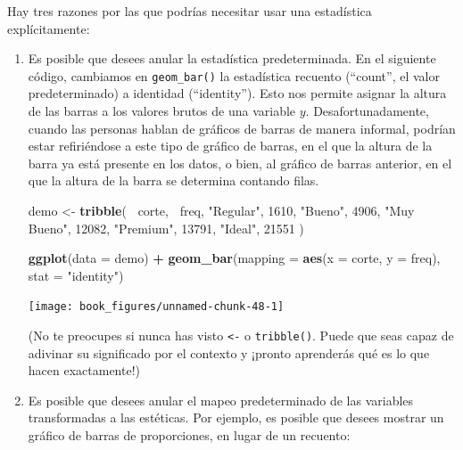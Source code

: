 \documentclass[11pt,oneside]{report}
\newenvironment{Shaded}{\begin{snugshade}}{\end{snugshade}}
\newcommand{\DataTypeTok}[1]{\textcolor[rgb]{0.13,0.29,0.53}{#1}}
\newcommand{\DecValTok}[1]{\textcolor[rgb]{0.00,0.00,0.81}{#1}}
\newcommand{\KeywordTok}[1]{\textcolor[rgb]{0.13,0.29,0.53}{\textbf{#1}}}
\newcommand{\NormalTok}[1]{#1}
\newcommand{\OperatorTok}[1]{\textcolor[rgb]{0.81,0.36,0.00}{\textbf{#1}}}
\newcommand{\StringTok}[1]{\textcolor[rgb]{0.31,0.60,0.02}{#1}}
\begin{document}
Hay tres razones por las que podrías necesitar usar una estadística
explícitamente:

\begin{enumerate}
\def\labelenumi{\arabic{enumi}.}
\item
  Es posible que desees anular la estadística predeterminada. En el
  siguiente código, cambiamos en \texttt{geom\_bar()} la estadística
  recuento (``count'', el valor predeterminado) a identidad
  (``identity''). Esto nos permite asignar la altura de las barras a los
  valores brutos de una variable \(y\). Desafortunadamente, cuando las
  personas hablan de gráficos de barras de manera informal, podrían
  estar refiriéndose a este tipo de gráfico de barras, en el que la
  altura de la barra ya está presente en los datos, o bien, al gráfico
  de barras anterior, en el que la altura de la barra se determina
  contando filas.

\begin{Shaded}
\begin{Highlighting}[]
\NormalTok{demo <-}\StringTok{ }\KeywordTok{tribble}\NormalTok{(}
  \OperatorTok{~}\NormalTok{corte,     }\OperatorTok{~}\NormalTok{freq,}
  \StringTok{"Regular"}\NormalTok{,   }\DecValTok{1610}\NormalTok{,}
  \StringTok{"Bueno"}\NormalTok{,     }\DecValTok{4906}\NormalTok{,}
  \StringTok{"Muy Bueno"}\NormalTok{, }\DecValTok{12082}\NormalTok{,}
  \StringTok{"Premium"}\NormalTok{,   }\DecValTok{13791}\NormalTok{,}
  \StringTok{"Ideal"}\NormalTok{,     }\DecValTok{21551}
\NormalTok{)}

\KeywordTok{ggplot}\NormalTok{(}\DataTypeTok{data =}\NormalTok{ demo) }\OperatorTok{+}
\StringTok{  }\KeywordTok{geom_bar}\NormalTok{(}\DataTypeTok{mapping =} \KeywordTok{aes}\NormalTok{(}\DataTypeTok{x =}\NormalTok{ corte, }\DataTypeTok{y =}\NormalTok{ freq), }\DataTypeTok{stat =} \StringTok{"identity"}\NormalTok{)}
\end{Highlighting}
\end{Shaded}

  \begin{center}\texttt{[image: book\_figures/unnamed-chunk-48-1]} \end{center}

  (No te preocupes si nunca has visto \texttt{\textless{}-} o
  \texttt{tribble()}. Puede que seas capaz de adivinar su significado
  por el contexto y ¡pronto aprenderás qué es lo que hacen exactamente!)
\item
  Es posible que desees anular el mapeo predeterminado de las variables
  transformadas a las estéticas. Por ejemplo, es posible que desees
  mostrar un gráfico de barras de proporciones, en lugar de un recuento:


\end{enumerate}
\end{document}

